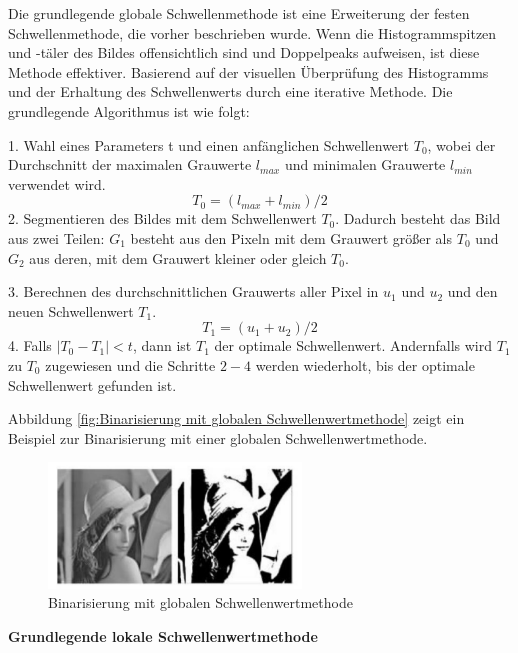 Die grundlegende globale Schwellenmethode ist eine Erweiterung der festen Schwellenmethode, die vorher beschrieben wurde. Wenn die Histogrammspitzen und -täler des Bildes offensichtlich sind und Doppelpeaks aufweisen, ist diese Methode effektiver. Basierend auf der visuellen Überprüfung des Histogramms und der Erhaltung des Schwellenwerts durch eine iterative Methode. Die grundlegende Algorithmus ist wie folgt:

1. Wahl eines Parameters t und einen anfänglichen Schwellenwert $ T_{0} $, wobei der Durchschnitt der maximalen Grauwerte $ l_{max} $ und minimalen Grauwerte  $ l_{min} $ verwendet wird. 
\begin{equation}
 T_{0} = (l_{max}+l_{min})/2 
\end{equation}
2. Segmentieren des Bildes mit dem Schwellenwert $ T_{0} $. Dadurch besteht das Bild aus zwei Teilen: $ G_{1} $ besteht aus den Pixeln mit dem Grauwert größer als $ T_{0} $ und $ G_{2} $ aus deren, mit dem Grauwert kleiner oder gleich $ T_{0} $.

3. Berechnen des durchschnittlichen Grauwerts aller Pixel in $ u_{1} $ und $ u_{2} $ und den neuen Schwellenwert $ T_{1} $.
\begin{equation}
 T_{1} = (u_{1}+u_{2})/2
\end{equation}
4. Falls $ |T_{0} - T_{1}| < t $, dann ist $ T_{1} $ der optimale Schwellenwert. Andernfalls wird $ T_{1} $ zu $ T_{0} $ zugewiesen und die Schritte $ 2-4 $ werden wiederholt, bis der optimale Schwellenwert gefunden ist.

Abbildung \ref{fig:Binarisierung mit globalen Schwellenwertmethode} zeigt ein Beispiel zur Binarisierung mit einer globalen Schwellenwertmethode.

\begin{figure}[H]
 \centering 
  \includegraphics[keepaspectratio,width=0.6\textwidth]{images/4_ZweiteErfahrung/Binar/global.pdf}
 \caption{Binarisierung mit globalen Schwellenwertmethode}
 \label{fig:Binarisierung mit globaler Schwellenwertmethode}
\end{figure} 

\textbf{Grundlegende lokale Schwellenwertmethode}

